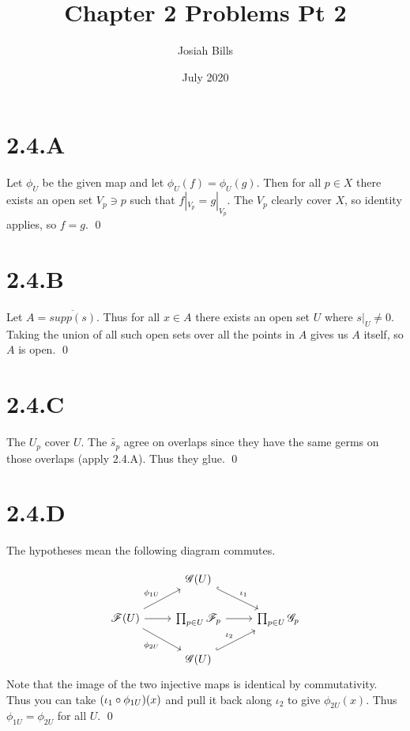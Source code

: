 \documentclass{article}
\title{Chapter 2 Problems Pt 2}
\author{Josiah Bills}
\date{July 2020}
\begin{document}
\maketitle

\section*{2.4.A}
Let $\phi_U$ be the given map and let $\phi_U(f)=\phi_U(g)$. Then for all $p \in X$
there exists an open set $V_p \ni p$ such that $f|_{V_p}=g|_{V_p}$. The $V_p$ clearly
cover $X$, so identity applies, so $f=g$. \qed

\section*{2.4.B}
Let $A=\overline{supp(s)}$. Thus for all $x \in A$ there exists an open set $U$ where $s|_U \not = 0$.
Taking the union of all such open sets over all the points in $A$ gives us $A$ itself, so $A$ is open. \qed

\section*{2.4.C}
The $U_p$ cover $U$. The $\widetilde{s_p}$ agree on overlaps since they have the same germs on those overlaps
(apply 2.4.A). Thus they glue. \qed

\section*{2.4.D}
The hypotheses mean the following diagram commutes.

\[
    \begin{tikzcd}
                                                                              & \mathscr{G}(U) \ar[dr, hook, "\iota_1"] \\
        \mathscr{F}(U) \ar[r] \ar[ur, "\phi_{1U}"] \ar[dr, swap, "\phi_{2U}"] &
        \prod_{p \in U} \mathscr{F}_p \ar[r]
                                                                              & \prod_{p \in U} \mathscr{G}_p           \\
                                                                              & \mathscr{G}(U) \ar[ur, hook, "\iota_2"]
    \end{tikzcd}
\]
Note that the image of the two injective maps is identical by commutativity. Thus you can
take $(\iota_1 \circ \phi_{1U})(x)$ and pull it back along
$\iota_2$ to give $\phi_{2U}(x)$. Thus $\phi_{1U}=\phi_{2U}$ for all $U$. \qed
\end{document}
